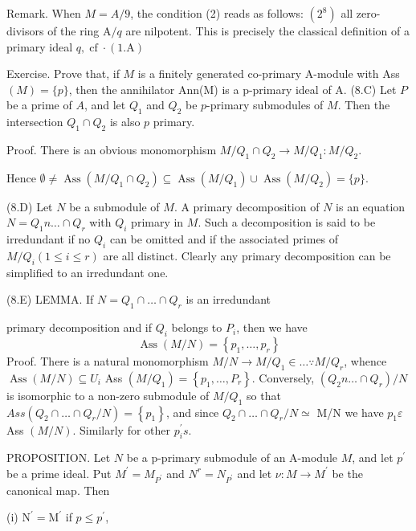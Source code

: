 Remark. When $M=A / 9$, the condition (2) reads as follows: $\left(2^{8}\right)$ all zero-divisors of the ring $\mathrm{A} / q$ are nilpotent. This is precisely the classical definition of a primary ideal $q, \operatorname{cf} \cdot(1 . \mathrm{A})$

Exercise. Prove that, if $M$ is a finitely generated co-primary A-module with Ass $(M)=\{p\}$, then the annihilator Ann(M) is a p-primary ideal of A. (8.C) Let $P$ be a prime of $A$, and let $Q_{1}$ and $Q_{2}$ be $p$-primary submodules of $M$. Then the intersection $Q_{1} \cap Q_{2}$ is also $p$ primary.

Proof. There is an obvious monomorphism $M / Q_{1} \cap Q_{2} \rightarrow M / Q_{1}: M / Q_{2}$.

Hence $\emptyset \neq \operatorname{Ass}\left(M / Q_{1} \cap Q_{2}\right) \subseteq \operatorname{Ass}\left(M / Q_{1}\right) \cup \operatorname{Ass}\left(M / Q_{2}\right)=\{p\}$.

(8.D) Let $N$ be a submodule of $M$. A primary decomposition of $N$ is an equation $N=Q_{1} n \ldots \cap Q_{r}$ with $Q_{i}$ primary in $M$. Such a decomposition is said to be irredundant if no $Q_{i}$ can be omitted and if the associated primes of $M / Q_{i}(1 \leqslant i \leqslant r)$ are all distinct. Clearly any primary decomposition can be simplified to an irredundant one.

(8.E) LEMMA. If $N=Q_{1} \cap \ldots \cap Q_{r}$ is an irredundant

primary decomposition and if $Q_{i}$ belongs to $P_{i}$, then we have
$$
\operatorname{Ass}(M / N)=\left\{p_{1}, \ldots, p_{r}\right\}
$$
Proof. There is a natural monomorphism $M / N \rightarrow M / Q_{1} \in \ldots \because M / Q_{r}$, whence $\operatorname{Ass}(M / N) \subseteq U_{i}$ Ass $\left(M / Q_{1}\right)=\left\{p_{1}, \ldots, P_{r}\right\}$. Conversely, $\left(Q_{2} n \ldots \cap Q_{r}\right) / N$ is isomorphic to a non-zero submodule of $M / Q_{1}$ so that $A s s\left(Q_{2} \cap \ldots \cap Q_{r} / N\right)=\left\{p_{1}\right\}$, and since $Q_{2} \cap \ldots \cap Q_{r} / N \simeq$ M/N we have $p_{1} \varepsilon$ Ass $(M / N) .$ Similarly for other $p_{i}^{\prime} s$.

PROPOSITION. Let $N$ be a p-primary submodule of an A-module $M$, and let $p^{\prime}$ be a prime ideal. Put $M^{\prime}=M_{P^{\prime}}$ and $N^{r}=N_{P^{\prime}}$ and let $\nu: M \rightarrow M^{\prime}$ be the canonical map. Then

(i) $\mathrm{N}^{\prime}=\mathrm{M}^{\prime}$ if $p \leq p^{\prime}$,

